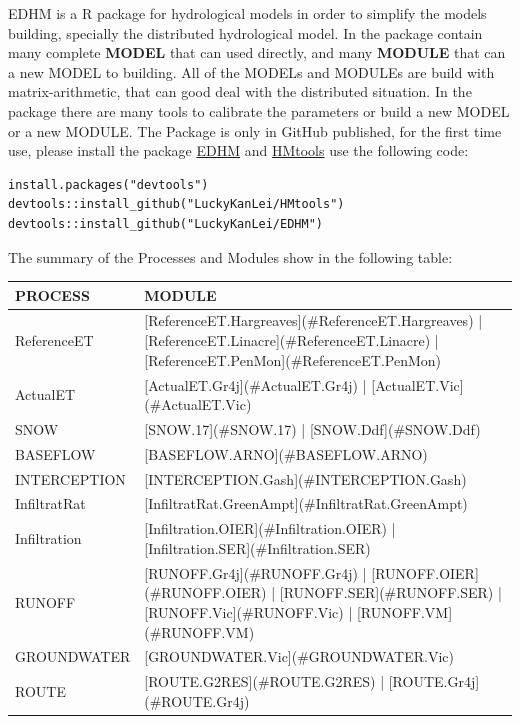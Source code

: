 \documentclass[
]{book}
\begin{document}
EDHM is a R package for hydrological models in order to simplify the models building, specially the distributed hydrological model. In the package contain many complete \textbf{MODEL} that can used directly, and many \textbf{MODULE} that can a new MODEL to building. All of the MODELs and MODULEs are build with matrix-arithmetic, that can good deal with the distributed situation. In the package there are many tools to calibrate the parameters or build a new MODEL or a new MODULE. The Package is only in GitHub published, for the first time use, please install the package \href{https://github.com/LuckyKanLei/EDHM}{EDHM} and \href{https://github.com/LuckyKanLei/HMtools}{HMtools} use the following code:

\begin{verbatim}
install.packages("devtools")
devtools::install_github("LuckyKanLei/HMtools")
devtools::install_github("LuckyKanLei/EDHM")
\end{verbatim}

The summary of the Processes and Modules show in the following table:

\begin{table}[!h]
\centering
\begin{tabular}{l|l}
\hline
PROCESS & MODULE\\
\hline
ReferenceET & [ReferenceET.Hargreaves](\#ReferenceET.Hargreaves) | [ReferenceET.Linacre](\#ReferenceET.Linacre) | [ReferenceET.PenMon](\#ReferenceET.PenMon)\\
\cline{1-2}
ActualET & [ActualET.Gr4j](\#ActualET.Gr4j) | [ActualET.Vic](\#ActualET.Vic)\\
\cline{1-2}
SNOW & [SNOW.17](\#SNOW.17) | [SNOW.Ddf](\#SNOW.Ddf)\\
\cline{1-2}
BASEFLOW & [BASEFLOW.ARNO](\#BASEFLOW.ARNO)\\
\cline{1-2}
INTERCEPTION & [INTERCEPTION.Gash](\#INTERCEPTION.Gash)\\
\cline{1-2}
InfiltratRat & [InfiltratRat.GreenAmpt](\#InfiltratRat.GreenAmpt)\\
\cline{1-2}
Infiltration & [Infiltration.OIER](\#Infiltration.OIER) | [Infiltration.SER](\#Infiltration.SER)\\
\cline{1-2}
RUNOFF & [RUNOFF.Gr4j](\#RUNOFF.Gr4j) | [RUNOFF.OIER](\#RUNOFF.OIER) | [RUNOFF.SER](\#RUNOFF.SER) | [RUNOFF.Vic](\#RUNOFF.Vic) | [RUNOFF.VM](\#RUNOFF.VM)\\
\cline{1-2}
GROUNDWATER & [GROUNDWATER.Vic](\#GROUNDWATER.Vic)\\
\cline{1-2}
ROUTE & [ROUTE.G2RES](\#ROUTE.G2RES) | [ROUTE.Gr4j](\#ROUTE.Gr4j)\\
\hline
\end{tabular}
\end{table}
\end{document}
